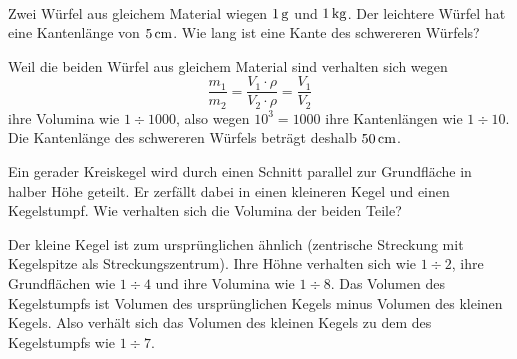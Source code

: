 \documentclass[%
11pt,%
twoside,%
titlepage,%
a4page,%
headsepline%
]{scrartcl}
\begin{document}
\begin{bsps}
\ \\[-2ex]
\begin{enumeratea}
\item Zwei W\"urfel aus gleichem Material wiegen $\unit[1]{g}$ und $\unit[1]{kg}$. Der leichtere W\"urfel hat eine Kantenl\"ange von $\unit[5]{cm}$. Wie lang ist eine Kante des schwereren W\"urfels?

Weil die beiden W\"urfel aus gleichem Material sind verhalten sich wegen
$$\frac{m_1}{m_2}=\frac{V_1\cdot\rho}{V_2\cdot\rho}=\frac{V_1}{V_2}$$
ihre Volumina wie $1\div1000$, also wegen $10^3=1000$ ihre Kantenl\"angen wie $1\div10$. Die Kantenl\"ange des schwereren W\"urfels betr\"agt deshalb $\unit[50]{cm}$.
\item Ein gerader Kreiskegel wird durch einen Schnitt parallel zur Grundfl\"ache in halber H\"ohe geteilt. Er zerf\"allt dabei in einen kleineren Kegel und einen Kegelstumpf. Wie verhalten sich die Volumina der beiden Teile?

Der kleine Kegel ist zum urspr\"unglichen \"ahnlich (zentrische Streckung mit Kegelspitze als Streckungszentrum). Ihre H\"ohne verhalten sich wie $1\div2$, ihre Grundfl\"achen wie $1\div4$ und ihre Volumina wie $1\div8$. Das Volumen des Kegelstumpfs ist Volumen des urspr\"unglichen Kegels minus Volumen des kleinen Kegels. Also verh\"alt sich das Volumen des kleinen Kegels zu dem des Kegelstumpfs wie $1\div7$.
\end{enumeratea}
\end{bsps}

\pagebreak

\vspace*{-2ex}
\end{document}
